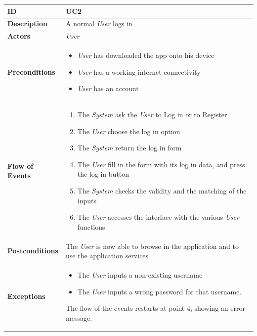 \begin{table}[H]
\begin{tabular}{|l|p{}|}
\hline
\textbf{ID}             & UC2                                                                             \\ \hline
\textbf{Description}    & A normal \textit{User} logs in \\ \hline
\textbf{Actors}         &   \textit{User}                                                                            \\ \hline

\textbf{Preconditions}  &   \begin{itemize}

 \item \textit{User} has downloaded the app onto his device
   \item      \textit{User} has a working internet connectivity
     \item       \textit{User} has an account
                 \end{itemize}     
                    \\ \hline
                    
\textbf{Flow of Events} &   \begin{enumerate}
    \item The \textit{System} ask the \textit{User} to Log in or to Register
    \item The \textit{User} choose the log in option
    \item The \textit{System} return the log in form
    \item The \textit{User} fill in the form with its log in data, and press the log in button
    \item The \textit{System} checks the validity and the matching of the inputs
    \item The \textit{User} accesses the interface with the various \textit{User} functions

\end{enumerate}                                                                             \\ \hline
\textbf{Postconditions} &  The \textit{User} is now able  to browse in the application and to use the application services                                                                     \\ \hline

\textbf{Exceptions} &    \begin{itemize}
    \item The \textit{User} inputs a non-existing username
    \item The \textit{User} inputs a wrong password for that username. 

\end{itemize}                                             The flow of the events restarts at point 4, showing an error message.                                \\ \hline

\end{tabular}
\end{table}


